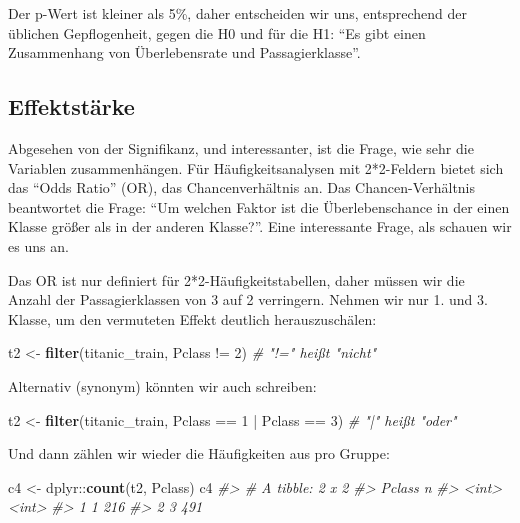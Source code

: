 \documentclass[12pt,ngerman,]{book}
\makeatletter
\newenvironment{Shaded}{\begin{snugshade}}{\end{snugshade}}
\newcommand{\KeywordTok}[1]{\textcolor[rgb]{0.13,0.29,0.53}{\textbf{{#1}}}}
\newcommand{\DecValTok}[1]{\textcolor[rgb]{0.00,0.00,0.81}{{#1}}}
\newcommand{\StringTok}[1]{\textcolor[rgb]{0.31,0.60,0.02}{{#1}}}
\newcommand{\CommentTok}[1]{\textcolor[rgb]{0.56,0.35,0.01}{\textit{{#1}}}}
\newcommand{\NormalTok}[1]{{#1}}
\newenvironment{kframe}{%
\medskip{}
\setlength{\fboxsep}{.8em}
 \def\at@end@of@kframe{}%
 \ifinner\ifhmode%
  \def\at@end@of@kframe{\end{minipage}}%
  \begin{minipage}{\columnwidth}%
 \fi\fi%
 \def\FrameCommand##1{\hskip\@totalleftmargin \hskip-\fboxsep
 \colorbox{shadecolor}{##1}\hskip-\fboxsep
     \hskip-\linewidth \hskip-\@totalleftmargin \hskip\columnwidth}%
 \MakeFramed {\advance\hsize-\width
   \@totalleftmargin\z@ \linewidth\hsize
   \@setminipage}}%
 {\par\unskip\endMakeFramed%
 \at@end@of@kframe}
\renewenvironment{Shaded}{\begin{kframe}}{\end{kframe}}
\makeatother
\begin{document}
Der p-Wert ist kleiner als 5\%, daher entscheiden wir uns, entsprechend
der üblichen Gepflogenheit, gegen die H0 und für die H1: ``Es gibt einen
Zusammenhang von Überlebensrate und Passagierklasse''.

\subsection{Effektstärke}\label{effektstarke}

Abgesehen von der Signifikanz, und interessanter, ist die Frage, wie
sehr die Variablen zusammenhängen. Für Häufigkeitsanalysen mit
2*2-Feldern bietet sich das ``Odds Ratio'' (OR), das Chancenverhältnis
an. Das Chancen-Verhältnis beantwortet die Frage: ``Um welchen Faktor
ist die Überlebenschance in der einen Klasse größer als in der anderen
Klasse?''. Eine interessante Frage, als schauen wir es uns an.

Das OR ist nur definiert für 2*2-Häufigkeitstabellen, daher müssen wir
die Anzahl der Passagierklassen von 3 auf 2 verringern. Nehmen wir nur
1. und 3. Klasse, um den vermuteten Effekt deutlich herauszuschälen:

\begin{Shaded}
\begin{Highlighting}[]
\NormalTok{t2 <-}\StringTok{ }\KeywordTok{filter}\NormalTok{(titanic_train, Pclass !=}\StringTok{ }\DecValTok{2}\NormalTok{)  }\CommentTok{# "!=" heißt "nicht"}
\end{Highlighting}
\end{Shaded}

Alternativ (synonym) könnten wir auch schreiben:

\begin{Shaded}
\begin{Highlighting}[]
\NormalTok{t2 <-}\StringTok{ }\KeywordTok{filter}\NormalTok{(titanic_train, Pclass ==}\StringTok{ }\DecValTok{1} \NormalTok{|}\StringTok{ }\NormalTok{Pclass ==}\StringTok{ }\DecValTok{3}\NormalTok{)  }\CommentTok{# "|" heißt "oder"}
\end{Highlighting}
\end{Shaded}

Und dann zählen wir wieder die Häufigkeiten aus pro Gruppe:

\begin{Shaded}
\begin{Highlighting}[]
\NormalTok{c4 <-}\StringTok{ }\NormalTok{dplyr::}\KeywordTok{count}\NormalTok{(t2, Pclass)}
\NormalTok{c4}
\CommentTok{#> # A tibble: 2 x 2}
\CommentTok{#>   Pclass     n}
\CommentTok{#>    <int> <int>}
\CommentTok{#> 1      1   216}
\CommentTok{#> 2      3   491}
\end{Highlighting}
\end{Shaded}
\end{document}
